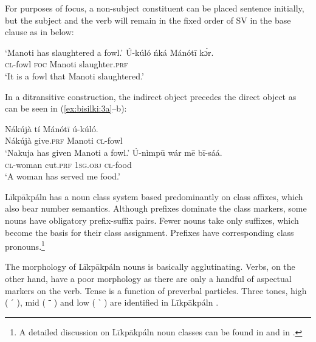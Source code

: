 \documentclass[output=paper,colorlinks,citecolor=brown]{langscibook}
\begin{document}
For purposes of focus, a non-subject constituent can be placed sentence initially, but the subject and the verb will remain in the fixed order of SV in the base clause as in  below:

\ea%
    \label{ex:bisilki:2}
    \glt    ‘Manoti has slaughtered a fowl.’
    \ex\label{ex:bisilki:2b}
    \gll    Ú-kúló	ńká	Mánótī	kɔ́r.\\
            \textsc{cl-}fowl	\textsc{foc}	Manoti	slaughter\textsc{.prf}\\
    \glt    ‘It is a fowl that Manoti slaughtered.’
    \z
\z

In a ditransitive construction, the indirect object precedes the direct object as can be seen in (\ref{ex:bisilki:3a}--b):

\ea%
    \label{ex:bisilki:3}
    \ea\label{ex:bisilki:3a}
    \gll    Nákújà 	tí		Mánótī	ú-kúló.\\
             Nákújà give\textsc{.prf} 	Manoti	\textsc{cl-}fowl\\
    \glt    ‘Nakuja has given Manoti a fowl.’
    \ex\label{ex:bisilki:3b}
    \gll    Ú-nìmpū	wár		mē		bī-sáá.\\
            \textsc{cl-}woman	cut\textsc{.prf}	\textsc{1sg.obj}	\textsc{cl-}food\\
    \glt    ‘A woman has served me food.’
    \z
\z

\begin{sloppypar}
Līkpākpáln has a  noun class system based predominantly on class affixes, which also bear number semantics. Although prefixes dominate the class markers, some nouns have obligatory prefix-suffix pairs. Fewer nouns take only suffixes, which become the basis for their class assignment. Prefixes have corresponding class pronouns.\footnote{A detailed discussion on Līkpākpáln noun classes can be found in \cite{BisilkiAkpanglo-Nartey2017} and in \cite{Winkelmann2012}.}
\end{sloppypar}

The morphology of Līkpākpáln nouns is basically agglutinating. Verbs, on the other hand, have a poor morphology as there are only a handful of aspectual markers on the verb. Tense is a function of preverbal particles. Three tones, high ( ˊ ), mid ( ˉ ) and low ( ˋ ) are identified in Līkpākpáln \citep[16]{SteeleWeed1966}.
\end{document}
